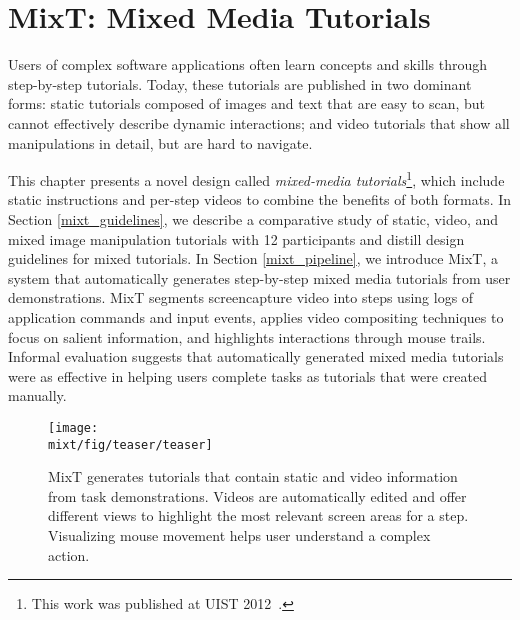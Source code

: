 \chapter{MixT: Mixed Media Tutorials}
\label{chapter_mixt}

Users of complex software applications often learn concepts and skills through step-by-step tutorials. Today, these tutorials are published in two dominant forms: static tutorials composed of images and text that are easy to scan, but cannot effectively describe dynamic interactions; and video tutorials that show all manipulations in detail, but are hard to navigate.

This chapter presents a novel design called \emph{mixed-media tutorials}\footnote{This work was published at UIST 2012~\cite{Chi:2012:MAG:2380116.2380130}.}, which include static instructions and per-step videos to combine the benefits of both formats. In Section \ref{mixt_guidelines}, we describe a comparative study of static, video, and mixed image manipulation tutorials with 12 participants and distill design guidelines for mixed tutorials.
%
In Section \ref{mixt_pipeline}, we introduce MixT, a system that automatically generates step-by-step mixed media tutorials from user demonstrations. MixT segments screencapture video into steps using logs of application commands and input events, applies video compositing techniques to focus on salient information, and highlights interactions through mouse trails. Informal evaluation suggests that automatically generated mixed media tutorials were as effective in helping users complete tasks as tutorials that were created manually.
%

\begin{figure*}[t]
  \centering
  \texttt{[image: \\mixt/fig/teaser/teaser]}
  \caption{MixT generates tutorials that contain static and video information from task demonstrations. Videos are automatically edited and offer different views to highlight the most relevant screen areas for a step. Visualizing mouse movement helps user understand a complex action.}
  \label{fig:mixt_teaser}
\end{figure*}












